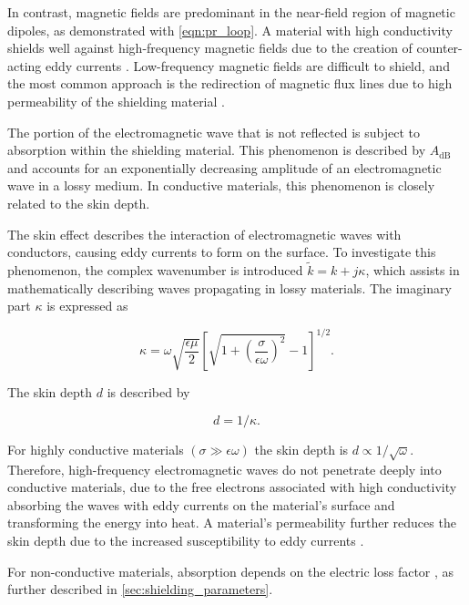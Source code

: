 In contrast, magnetic fields are predominant in the near-field region of magnetic dipoles, as demonstrated with \eqref{eqn:pr_loop}. A material with high conductivity shields well against high-frequency magnetic fields due to the creation of counter-acting eddy currents \cite[p.~112]{Jaroszewski_Thomas_Rane_2019}. Low-frequency magnetic fields are difficult to shield, and the most common approach is the redirection of magnetic flux lines due to high permeability of the shielding material \cite[pp.~112-113]{Jaroszewski_Thomas_Rane_2019}.

The portion of the electromagnetic wave that is not reflected is subject to absorption within the shielding material. This phenomenon is described by $A_{\mathrm{dB}}$ and accounts for an exponentially decreasing amplitude of an electromagnetic wave in a lossy medium. In conductive materials, this phenomenon is closely related to the skin depth.

The skin effect describes the interaction of electromagnetic waves with conductors, causing eddy currents to form on the surface. To investigate this phenomenon, the complex wavenumber is introduced $\tilde{k}=k + j\kappa$, which assists in mathematically describing waves propagating in lossy materials. The imaginary part $\kappa$ is expressed as

\begin{equation}
	\kappa = \omega \sqrt{\frac{\epsilon \mu}{2}}\left[\sqrt{ 1+\left(\frac{\sigma}{\epsilon\omega}\right) ^2 } -1\right]^{1/2}.
	\label{eqn:kappa}
\end{equation}

The skin depth $d$ is described by 

\begin{equation}
	d = 1/\kappa.
	\label{eqn:skin_depth}
\end{equation}

For highly conductive materials $\left(\sigma \gg \epsilon\omega\right)$ the skin depth is $d \propto 1/\sqrt{\omega}$. Therefore, high-frequency electromagnetic waves do not penetrate deeply into conductive materials, due to the free electrons associated with high conductivity absorbing the waves with eddy currents on the material's surface and transforming the energy into heat. A material's permeability further reduces the skin depth due to the increased susceptibility to eddy currents \cite[p. 104]{Jaroszewski_Thomas_Rane_2019}.

For non-conductive materials, absorption depends on the electric loss factor \cite[pp.~102-103]{Jaroszewski_Thomas_Rane_2019}, as further described in \cref{sec:shielding_parameters}.

